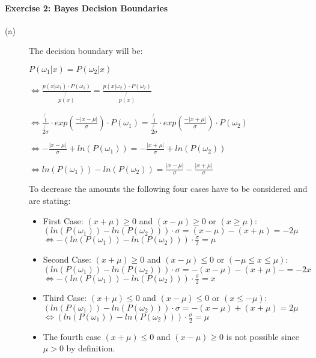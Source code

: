 \documentclass{article}
\begin{document}
\paragraph{Exercise 2: Bayes Decision Boundaries}

\begin{description}

\item[(a)]
The decision boundary will be:

$P(\omega_1|x) = P (\omega_2|x)$

$\Leftrightarrow \frac{p(x|\omega_1)\cdot P(\omega_1)}{\not{p(x)}} = \frac{p(x|\omega_2) \cdot P(\omega_2)}{\not{p(x)}}$

$\Leftrightarrow \frac{\not{1}}{\not{2 \sigma}}\cdot exp(\frac{-|x-\mu|}{\sigma}) \cdot P(\omega_1) = \frac{\not{1}}{\not{2 \sigma}}\cdot exp(\frac{-|x+\mu|}{\sigma}) \cdot P(\omega_2)$

$\Leftrightarrow -\frac{|x-\mu|}{\sigma} + ln(P(\omega_1)) = -\frac{|x+\mu|}{\sigma} + ln (P(\omega_2))$


\vspace{0.3cm}
$\Leftrightarrow ln(P(\omega_1)) - ln (P(\omega_2)) = \frac{|x-\mu|}{\sigma} - \frac{|x+\mu|}{\sigma} $

\vspace{0.3cm}
To decrease the amounts the following four cases have to be considered and are stating:

\begin{itemize}
    \item First Case: $(x+\mu) \geq 0$ and $(x - \mu) \geq 0$ or $(x \geq \mu)$:\\
    $(ln(P(\omega_1)) - ln (P(\omega_2))) \cdot \sigma = (x-\mu) - (x+\mu) = -2 \mu$ \\
    $\Leftrightarrow -(ln(P(\omega_1)) - ln (P(\omega_2))) \cdot \frac{\sigma}{2} = \mu$
    \item Second Case: $(x+\mu) \geq 0$ and $(x - \mu) \leq 0$ or $(-\mu \leq x \leq \mu)$:\\
    $(ln(P(\omega_1)) - ln (P(\omega_2))) \cdot \sigma = -(x-\mu) -(x+\mu) -  = -2x$ \\
    $\Leftrightarrow -(ln(P(\omega_1)) - ln (P(\omega_2))) \cdot \frac{\sigma}{2} =  x$
    \item Third Case: $(x+\mu) \leq 0$ and $(x - \mu) \leq 0$ or $(x \leq -\mu)$:\\
    $(ln(P(\omega_1)) - ln (P(\omega_2))) \cdot \sigma = -(x-\mu) + (x+\mu)   =  2\mu$\\
    $\Leftrightarrow (ln(P(\omega_1)) - ln (P(\omega_2))) \cdot \frac{\sigma}{2} = \mu$
    \item The fourth case $(x+\mu) \leq 0$ and $(x - \mu) \geq 0$ is not possible since $\mu > 0$ by definition.
\end{itemize}


\end{description}
\end{document}
